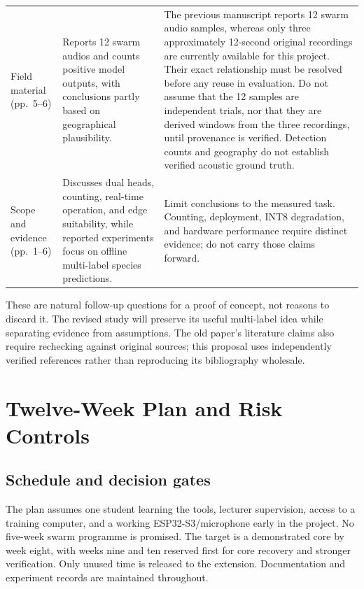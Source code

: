 \documentclass[a4paper,11pt]{article}
\begin{document}
\begin{small}
\begin{longtable}{P{3.15cm}P{6.0cm}P{6.75cm}}
Field material (pp.~5--6) & Reports 12 swarm audios and counts positive model outputs, with conclusions partly based on geographical plausibility. & The previous manuscript reports 12 swarm audio samples, whereas only three approximately 12-second original recordings are currently available for this project. Their exact relationship must be resolved before any reuse in evaluation. Do not assume that the 12 samples are independent trials, nor that they are derived windows from the three recordings, until provenance is verified. Detection counts and geography do not establish verified acoustic ground truth.\\
Scope and evidence (pp.~1--6) & Discusses dual heads, counting, real-time operation, and edge suitability, while reported experiments focus on offline multi-label species predictions. & Limit conclusions to the measured task. Counting, deployment, INT8 degradation, and hardware performance require distinct evidence; do not carry those claims forward.\\
\bottomrule
\end{longtable}
\end{small}

These are natural follow-up questions for a proof of concept, not reasons to discard it. The revised study will preserve its useful multi-label idea while separating evidence from assumptions. The old paper's literature claims also require rechecking against original sources; this proposal uses independently verified references rather than reproducing its bibliography wholesale.

\section{Twelve-Week Plan and Risk Controls}
\subsection{Schedule and decision gates}
The plan assumes one student learning the tools, lecturer supervision, access to a training computer, and a working ESP32-S3/microphone early in the project. No five-week swarm programme is promised. The target is a demonstrated core by week eight, with weeks nine and ten reserved first for core recovery and stronger verification. Only unused time is released to the extension. Documentation and experiment records are maintained throughout.
\end{document}
